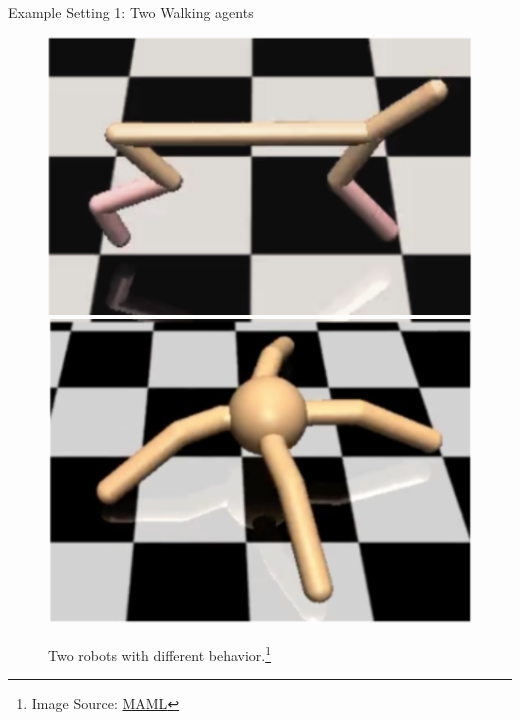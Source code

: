\begin{frame}[c]{Example Setting 1: Two Walking agents}

\begin{figure}
\centering
\includegraphics[scale=0.5]{images/cheetah}
\includegraphics[scale=0.5]{images/ant}
\caption{Two robots with different behavior.\footnote{Image Source: \href{https://arxiv.org/pdf/1703.03400.pdf}{MAML}}}
\end{figure}

\end{frame}

